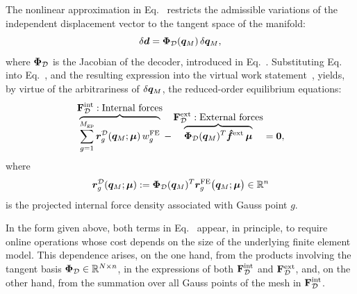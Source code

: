 \documentclass[preprint,10pt]{elsarticle}  %
\begin{document}
The nonlinear approximation in Eq.~ restricts the
admissible variations of the independent displacement vector to the
tangent space of the manifold:
\begin{equation}
\label{eq:manifold_virtual_variations}
\delta\bm{d}
=
\bm{\Phi}_{\mathcal{D}}(\bm{q}_M)\,\delta\bm{q}_M,
\end{equation}
where $\bm{\Phi}_{\mathcal{D}}$ is the Jacobian of the decoder, introduced in Eq.~. Substituting Eq.~ into
Eq.~, and the resulting expression into the
virtual work statement~, yields, by virtue of the arbitrariness of
\(\delta\bm{q}_M\), the reduced-order equilibrium equations:
\begin{equation}
\label{eq:manifold_ROM_equilibrium_FE_weights}
\overbrace{
\sum_{g=1}^{M_{\mathrm{gp}}}
\bm{r}^{\mathcal{D}}_{g}(\bm{q}_M;\bm{\mu})\,w^{\mathrm{FE}}_{g}}^{\displaystyle\displaystyle \mathbf{F}^{\mathrm{int}}_{\mathcal{D}}:\textrm{Internal forces}}
-
\overbrace{
\bm{\Phi}_{\mathcal{D}}(\bm{q}_M)^T\bm{\hat{f}}^{\mathrm{ext}}\,\bm{\mu}}^{\displaystyle\mathbf{F}^{\mathrm{ext}}_{\mathcal{D}}: \textrm{External forces}}
=
\bm{0},
\end{equation}
where
\begin{equation}
\label{eq:rDec_definition}
\bm{r}^{\mathcal{D}}_{g}(\bm{q}_M;\bm{\mu})
:=
\bm{\Phi}_{\mathcal{D}}(\bm{q}_M)^T
\bm{r}^{\mathrm{FE}}_{g}\bigl(\bm{q}_M;\bm{\mu}\bigr)
\in\mathbb{R}^{n}
\end{equation}
is the  projected internal force density associated with Gauss
point \(g\).


In the form given above, both terms in
Eq.~ appear, in principle, to require  online operations whose cost depends on the size
of the underlying finite element model. This   dependence arises, on the one hand,
from the products involving the tangent basis
\(\bm{\Phi}_{\mathcal{D}}\in\mathbb{R}^{N \times n}\), in the expressions of  both $\displaystyle \mathbf{F}^{\mathrm{int}}_{\mathcal{D}}$ and $\mathbf{F}^{\mathrm{ext}}_{\mathcal{D}}$, and, on the other hand,  from the summation over all
  Gauss points of the mesh in $\displaystyle \mathbf{F}^{\mathrm{int}}_{\mathcal{D}}$.
\end{document}
